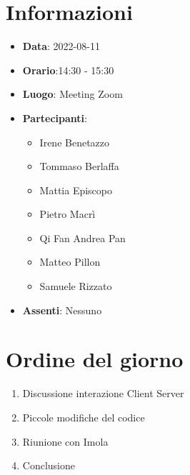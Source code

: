 \section{Informazioni}
	\begin{itemize}
		\item \textbf{Data}: 2022-08-11     %
		\item \textbf{Orario}:14:30 - 15:30         %
		\item \textbf{Luogo}: Meeting Zoom
		\item \textbf{Partecipanti}:
		\begin{itemize}
			\item Irene Benetazzo
			\item Tommaso Berlaffa
			\item Mattia Episcopo
			\item Pietro Macrì
			\item Qi Fan Andrea Pan
			\item Matteo Pillon
			\item Samuele Rizzato
		\end{itemize}
        \item \textbf{Assenti}: Nessuno
	\end{itemize}
    
	\section{Ordine del giorno}
	\begin{enumerate}
		\item Discussione interazione Client Server
		\item Piccole modifiche del codice
		\item Riunione con Imola
		\item Conclusione
	\end{enumerate}
	\newpage
